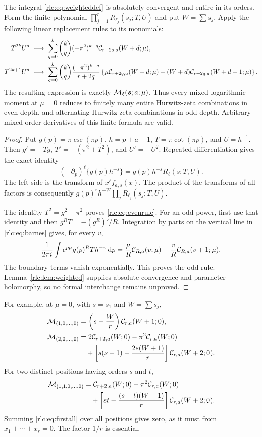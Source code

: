 \begin{theorem}
\label{rlc:thm:allmoments}
The integral \eqref{rlc:eq:weighteddef} is absolutely convergent and
entire in its orders. Form the finite polynomial
$\prod_{j=1}^r R_{\ell_j}(s_j;T,U)$ and put $W=\sum s_j$.
Apply the following linear replacement rules to its monomials:
\begin{align}
 T^{2k}U^d\ &\longmapsto\
 \sum_{q=0}^k\binom{k}{q}(-\pi^2)^{k-q}
        \mathcal C_{r+2q,a}(W+d;\mu),\label{rlc:eq:evenrule}\\
 T^{2k+1}U^d\ &\longmapsto\
 \sum_{q=0}^k\binom{k}{q}\frac{(-\pi^2)^{k-q}}{r+2q}
 \left\{\mu\mathcal C_{r+2q,a}(W+d;\mu)
 -(W+d)\mathcal C_{r+2q,a}(W+d+1;\mu)\right\}.
 \label{rlc:eq:oddrule}
\end{align}
The resulting expression is exactly
$\mathcal M_{\boldsymbol\ell}(\boldsymbol s;a;\mu)$.
Thus every mixed logarithmic moment at $\mu=0$ reduces to finitely many
entire Hurwitz-zeta combinations in even depth, and alternating
Hurwitz-zeta combinations in odd depth. Arbitrary mixed order
derivatives of this finite formula are valid.
\end{theorem}
\begin{proof}
Put $g(p)=\pi\csc(\pi p)$, $h=p+a-1$, $T=\pi\cot(\pi p)$,
and $U=h^{-1}$. Then
$g'=-Tg$, $T'=-(\pi^2+T^2)$, and $U'=-U^2$.
Repeated differentiation gives the exact identity
\[
 (-\partial_p)^\ell\{g(p)h^{-s}\}
       =g(p)h^{-s}R_\ell(s;T,U).
\]
The left side is the transform of $x^\ell f_{a,s}(x)$.
The product of the transforms of all factors is consequently
$g(p)^r h^{-W}\prod_jR_{\ell_j}(s_j;T,U)$.

The identity $T^2=g^2-\pi^2$ proves
\eqref{rlc:eq:evenrule}. For an odd power, first use that identity
and then $g^R T=-(g^R)'/R$. Integration by parts on the vertical line
in \eqref{rlc:eq:barnes} gives, for every $v$,
\[
 \frac1{2\pi i}\int e^{p\mu}g(p)^R T h^{-v}\,\mathrm d p
 =\frac{\mu}{R}\mathcal C_{R,a}(v;\mu)
       -\frac{v}{R}\mathcal C_{R,a}(v+1;\mu).
\]
The boundary terms vanish exponentially. This proves the odd rule.
Lemma~\ref{rlc:lem:weighted} supplies absolute convergence and parameter
holomorphy, so no formal interchange remains unproved.
\end{proof}

For example, at $\mu=0$, with $s=s_1$ and $W=\sum s_j$,
\begin{align}
 \mathcal M_{(1,0,\ldots,0)}
 &=\left(s-\frac Wr\right)\mathcal C_{r,a}(W+1;0),
 \label{rlc:eq:firstall}\\
 \mathcal M_{(2,0,\ldots,0)}
 &=2\mathcal C_{r+2,a}(W;0)-\pi^2\mathcal C_{r,a}(W;0)\notag\\
 &\quad+\left[s(s+1)-\frac{2s(W+1)}r\right]
                \mathcal C_{r,a}(W+2;0).
 \label{rlc:eq:secondall}
\end{align}
For two distinct positions having orders $s$ and $t$,
\begin{align}
 \mathcal M_{(1,1,0,\ldots,0)}
 &=\mathcal C_{r+2,a}(W;0)-\pi^2\mathcal C_{r,a}(W;0)\notag\\
 &\quad+\left[st-\frac{(s+t)(W+1)}r\right]
                    \mathcal C_{r,a}(W+2;0).
 \label{rlc:eq:mixedsecond}
\end{align}
Summing \eqref{rlc:eq:firstall} over all positions gives zero, as it
must from $x_1+\cdots+x_r=0$. The factor $1/r$ is essential.


